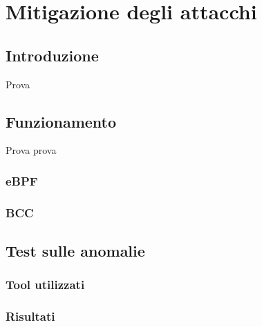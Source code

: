 \chapter{Mitigazione degli attacchi}


\section{Introduzione}
Prova 


\section{Funzionamento}
Prova prova
\subsection{eBPF}
\subsection{BCC}

\section{Test sulle anomalie}
\subsection{Tool utilizzati}
\subsection{Risultati}
